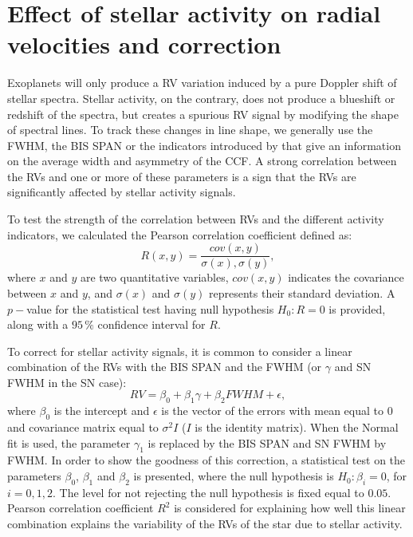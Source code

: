 \documentclass[11pt, oneside]{article}
\begin{document}
\section{Effect of stellar activity on radial velocities and correction} \label{sec:31}

Exoplanets will only produce a RV variation induced by a pure Doppler shift of stellar spectra. Stellar activity, on the contrary, does not produce a blueshift or redshift of the spectra, but creates a spurious RV signal by modifying the shape of spectral lines. To track these changes in line shape, we generally use the FWHM, the BIS SPAN or the indicators introduced by \citet{Figueira-2013} that give an information on the average width and asymmetry of the CCF. A strong correlation between the RVs and one or more of these parameters is a sign that the RVs are significantly affected by stellar activity signals.

To test the strength of the correlation between RVs and the different activity indicators, we calculated the Pearson correlation coefficient defined as:
%
\begin{equation}
R (x,y)= \frac{cov(x,y)}{\sigma(x),\sigma(y)},
\label{eq:Pearson:corr}
\end{equation}
where $x$ and $y$ are two quantitative variables, $cov(x,y)$ indicates the covariance between $x$ and $y$, and $\sigma(x)$ and $\sigma(y)$ represents their standard deviation. 
A $p-$value for the statistical test having null hypothesis $H_{0}: R=0$ is provided, along with a $95\,\%$ confidence interval for $R$.
%

To correct for stellar activity signals, it is common to consider a linear combination of the RVs with the BIS SPAN and the FWHM (or $\gamma$ and SN FWHM in the SN case):
%
\begin{equation}
RV= \beta_{0} + \beta_{1}  \gamma + \beta_{2} FWHM + \epsilon,
\label{eq:RV:correction}
\end{equation}
%
where $\beta_{0}$ is the intercept and $\epsilon$ is the vector of the errors with mean equal to $0$ and covariance matrix equal to $\sigma^{2}I$ ($I$ is the identity matrix). When the Normal fit is used, the parameter $\gamma_1$ is replaced by the BIS SPAN and SN FWHM by FWHM. In order to show the goodness of this correction, a statistical test on the parameters $\beta_{0}$, $\beta_{1}$ and $\beta_{2}$ is presented, where the null hypothesis is $H_{0}: \beta_{i}=0$, for $i=0,1,2$. The level for not rejecting the null hypothesis is fixed equal to $0.05$. Pearson correlation coefficient $R^{2}$ is considered for explaining how well this linear combination explains the variability of the RVs of the star due to stellar activity.
\end{document}

